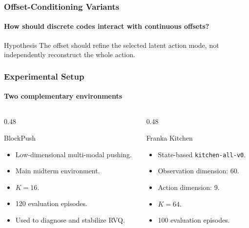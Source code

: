 \documentclass[aspectratio=169]{ctexbeamer}
\begin{document}
\begin{frame}
  \frametitle{Offset-Conditioning Variants}
  \framesubtitle{How should discrete codes interact with continuous offsets?}
  \small
  \begin{table}
  \centering
  \end{table}
  \vspace{0.5em}
  \begin{block}{Hypothesis}
    The offset should refine the selected latent action mode, not independently reconstruct the whole action.
  \end{block}
\end{frame}

\begin{frame}
  \frametitle{Experimental Setup}
  \framesubtitle{Two complementary environments}
  \begin{columns}[T]
    \begin{column}{0.48\textwidth}
      \begin{block}{BlockPush}
        \begin{itemize}
          \item Low-dimensional multi-modal pushing.
          \item Main midterm environment.
          \item $K=16$.
          \item 120 evaluation episodes.
          \item Used to diagnose and stabilize RVQ.
        \end{itemize}
      \end{block}
    \end{column}
    \begin{column}{0.48\textwidth}
      \begin{block}{Franka Kitchen}
        \begin{itemize}
          \item State-based \texttt{kitchen-all-v0}.
          \item Observation dimension: 60.
          \item Action dimension: 9.
          \item $K=64$.
          \item 100 evaluation episodes.
        \end{itemize}
      \end{block}
    \end{column}
  \end{columns}
\end{frame}
\end{document}
